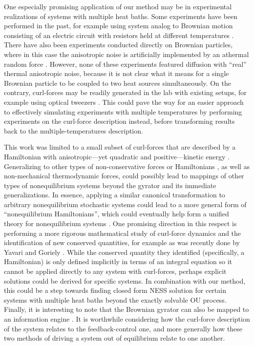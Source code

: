 One especially promising application of our method may be in experimental realizations of systems with multiple heat baths. Some experiments have been performed in the past, for example using system analog to Brownian motion consisting of an electric circuit with resistors held at different temperatures \cite{ciliberto2013heat, chiang2017electrical}. There have also been experiments conducted directly on Brownian particles, where in this case the anisotropic noise is artificially implemented by an athermal random force \cite{argun2017experimental, berut2014energy, lin2022stochastic, berut2016stationary, martins2026role}. However, none of these experiments featured diffusion with ``real'' thermal anisotropic noise, because it is not clear what it means for a single Brownian particle to be coupled to two heat sources simultaneously. On the contrary, curl-forces may be readily generated in the lab with existing setups, for example using optical tweezers \cite{roichman2008influence,roichman2008optical, sun2009brownian, wu2009direct, liberal2013near, sukhov2017non}. This could pave the way for an easier approach to effectively simulating experiments with multiple temperatures by performing experiments on the curl-force description instead, before transforming results back to the multiple-temperatures description.

This work was limited to a small subset of curl-forces that are described by a Hamiltonian with anisotropic---yet quadratic and positive---kinetic energy \cite{berry2015hamiltonian}. Generalizing to other types of non-conservative forces or Hamiltonians \cite{yip2024general}, as well as non-mechanical thermodynamic forces, could possibly lead to mappings of other types of nonequilibrium systems beyond the gyrator and its immediate generalizations. In essence, applying a similar canonical transformation to arbitrary nonequilibrium stochastic systems could lead to a more general form of ``nonequilibrium Hamiltonians'', which could eventually help form a unified theory for nonequilibrium systems \cite{ding2022unified}. One promising direction in this respect is performing a more rigorous mathematical study of curl-force dynamics and the identification of new conserved quantities, for example as was recently done by Yavari and Goriely \cite{yavari2025darboux}. While the conserved quantity they identified (specifically, a Hamiltonian) is only defined implicitly in terms of an integral equation so it cannot be applied directly to any system with curl-forces, perhaps explicit solutions could be derived for specific systems. In combination with our method, this could be a step towards finding closed form NESS solution for certain systems with multiple heat baths beyond the exactly solvable OU process. Finally, it is interesting to note that the Brownian gyrator can also be mapped to an information engine \cite{leighton2024information}. It is worthwhile considering how the curl-force description of the system relates to the feedback-control one, and more generally how these two methods of driving a system out of equilibrium relate to one another.

